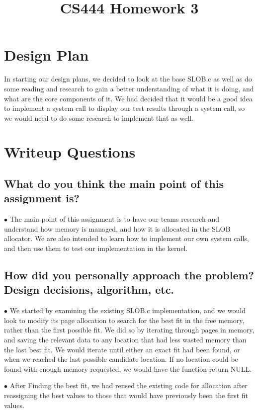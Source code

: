 \documentclass[letterpaper,10pt,fleqn,draftclsnofoot,onecolumn]{IEEEtran}
\title{CS444 Homework 3}
\author{\name}
\begin{document}
	\maketitle
	\hrulefill
	\section*{Design Plan}
	In starting our design plans, we decided to look at the base SLOB.c as well as do some reading and research to gain a better understanding of what it is doing, and what are the core components of it. We had decided that it would be a good idea to implement a system call to display our test results through a system call, so we would need to do some research to implement that as well.
	
	\section*{Writeup Questions}
	
	\subsection{What do you think the main point of this assignment is?}
	$\bullet$ The main point of this assignment is to have our teams research and understand how memory is managed, and how it is allocated in the SLOB allocator. We are also intended to learn how to implement our own system calls, and then use them to test our implementation in the kernel.
	
	\subsection{How did you personally approach the problem? Design decisions, algorithm, etc.}
	$\bullet$ We started by examining the existing SLOB.c implementation, and we would look to modify its page allocation to search for the best fit in the free memory, rather than the first possible fit. We did so by iterating through pages in memory, and saving the relevant data to any location that had less wasted memory than the last best fit. We would iterate until either an exact fit had been found, or when we reached the last possible candidate location. If no location could be found with enough memory requested, we would have the function return NULL.
	
	$\bullet$ After Finding the best fit, we had reused the existing code for allocation after reassigning the best values to those that would have previously been the first fit values.
	
\end{document}
